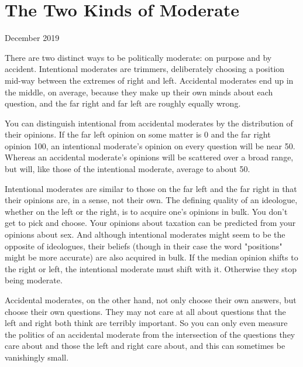 \chapter{The Two Kinds of Moderate}


            
              
                

December 2019

There are two distinct ways to be
                  politically moderate: on purpose and by accident. Intentional
                  moderates are trimmers, deliberately choosing a position
                  mid-way between the extremes of right and left. Accidental
                  moderates end up in the middle, on average, because they make
                  up their own minds about each question, and the far right and
                  far left are roughly equally wrong.

You can
                  distinguish intentional from accidental moderates by the
                  distribution of their opinions. If the far left opinion on
                  some matter is 0 and the far right opinion 100, an intentional
                  moderate's opinion on every question will be near 50. Whereas
                  an accidental moderate's opinions will be scattered over a
                  broad range, but will, like those of the intentional moderate,
                  average to about 50.

Intentional moderates are
                  similar to those on the far left and the far right in that
                  their opinions are, in a sense, not their own. The defining
                  quality of an ideologue, whether on the left or the right, is
                  to acquire one's opinions in bulk. You don't get to pick and
                  choose. Your opinions about taxation can be predicted from
                  your opinions about sex. And although intentional moderates
                  might seem to be the opposite of ideologues, their beliefs
                  (though in their case the word "positions" might be more
                  accurate) are also acquired in bulk. If the median opinion
                  shifts to the right or left, the intentional moderate must
                  shift with it. Otherwise they stop being moderate.

Accidental
                  moderates, on the other hand, not only choose their own
                  answers, but choose their own questions. They may not care at
                  all about questions that the left and right both think are
                  terribly important. So you can only even measure the politics
                  of an accidental moderate from the intersection of the
                  questions they care about and those the left and right care
                  about, and this can sometimes be vanishingly small.

